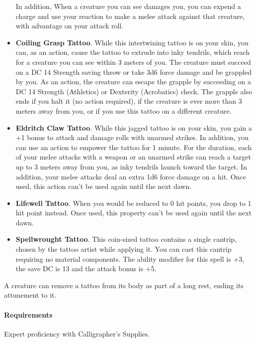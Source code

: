\begin{itemize}
        In addition, When a creature you can see damages you, you can expend a charge and use your reaction to make a melee attack against that creature, with advantage on your attack roll.
        \item \textbf{Coiling Grasp Tattoo}.
        While this intertwining tattoo is on your skin, you can, as an action, cause the tattoo to extrude into inky tendrils, which reach for a creature you can see within 3 meters of you.
        The creature must succeed on a DC 14 Strength saving throw or take 3d6 force damage and be grappled by you.
        As an action, the creature can escape the grapple by succeeding on a DC 14 Strength (Athletics) or Dexterity (Acrobatics) check.
        The grapple also ends if you halt it (no action required), if the creature is ever more than 3 meters away from you, or if you use this tattoo on a different creature.
        \item \textbf{Eldritch Claw Tattoo}.
        While this jagged tattoo is on your skin, you gain a +1 bonus to attack and damage rolls with unarmed strikes.
        In addition, you can use an action to empower the tattoo for 1 minute.
        For the duration, each of your melee attacks with a weapon or an unarmed strike can reach a target up to 3 meters away from you, as inky tendrils launch toward the target.
        In addition, your melee attacks deal an extra 1d6 force damage on a hit.
        Once used, this action can't be used again until the next dawn.
        \item \textbf{Lifewell Tattoo}.
        When you would be reduced to 0 hit points, you drop to 1 hit point instead.
        Once used, this property can't be used again until the next dawn.
        \item \textbf{Spellwrought Tattoo}.
        This coin-sized tattoo contains a single cantrip, chosen by the tattoo artist while applying it.
        You can cast this cantrip requiring no material components.
        The ability modifier for this spell is +3, the save DC is 13 and the attack bonus is +5.
    \end{itemize}

    A creature can remove a tattoo from its body as part of a long rest, ending its attunement to it.
    \paragraph{Requirements} Expert proficiency with Calligrapher's Supplies.

